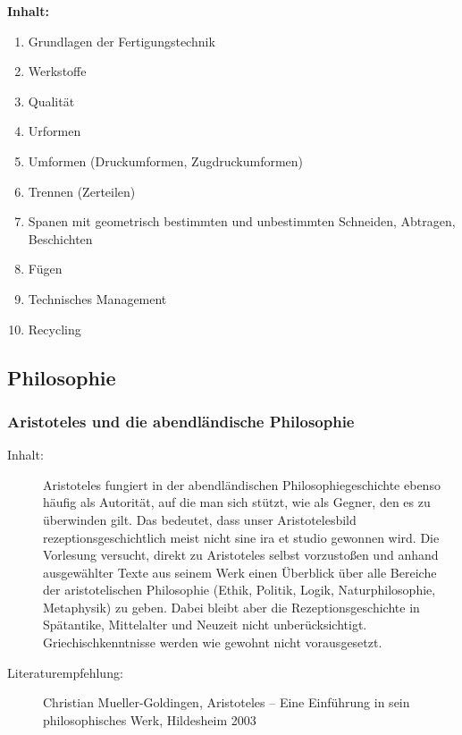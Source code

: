 \documentclass[%
a4paper, %
11pt,               %
leqno,              %
fleqn,              %
]
{scrartcl}
\begin{document}
\textsf{\textbf{Inhalt:}}
\begin{enumerate}\itemsep0pt
  \item Grundlagen der Fertigungstechnik
  \item Werkstoffe
  \item Qualität
  \item Urformen
  \item Umformen (Druckumformen, Zugdruckumformen)
  \item Trennen (Zerteilen)
  \item Spanen mit geometrisch bestimmten und unbestimmten Schneiden, Abtragen,
    Beschichten
  \item Fügen
  \item Technisches Management
  \item Recycling
\end{enumerate}



\subsection{Philosophie} %
\label{sub:Philosophie}

\subsubsection{Aristoteles und die abendländische Philosophie} %
\label{ssub:Aristoteles und die abendländische Philosophie}

\begin{description}
  \item[Inhalt:] Aristoteles fungiert in der abendländischen
    Philosophiegeschichte ebenso häufig als Autorität, auf die man sich stützt,
    wie als Gegner, den es zu überwinden gilt. Das bedeutet, dass unser
    Aristotelesbild rezeptionsgeschichtlich meist nicht sine ira et studio
    gewonnen wird. Die Vorlesung versucht, direkt zu Aristoteles selbst
    vorzustoßen und anhand ausgewählter Texte aus seinem Werk einen Überblick
    über alle Bereiche der aristotelischen Philosophie (Ethik, Politik, Logik,
    Naturphilosophie, Metaphysik) zu geben. Dabei bleibt aber die
    Rezeptionsgeschichte in Spätantike, Mittelalter und Neuzeit nicht
    unberücksichtigt. Griechischkenntnisse werden wie gewohnt nicht
    vorausgesetzt.
  \item[Literaturempfehlung:] Christian Mueller-Goldingen, Aristoteles -- Eine
    Einführung in sein philosophisches Werk, Hildesheim 2003
\end{description}
\end{document}
